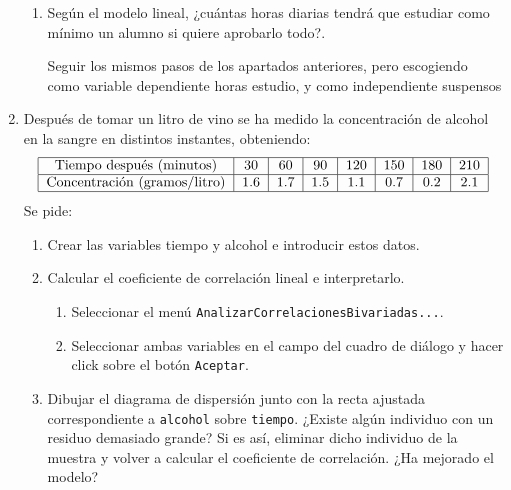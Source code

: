 \begin{enumerate}[leftmargin=*]
\begin{enumerate}
\item Según el modelo lineal, ¿cuántas horas diarias tendrá que
estudiar como mínimo un alumno si quiere aprobarlo todo?.

\begin{indicacion}{
Seguir los mismos pasos de los apartados anteriores, pero
escogiendo como variable dependiente \textsf{horas estudio}, y
como independiente \textsf{suspensos}}
\end{indicacion}



\end{enumerate}

\item Después de tomar un litro de vino se ha medido la
concentración de alcohol en la sangre en distintos instantes, obteniendo:
\[
\begin{tabular}{|c|c|c|c|c|c|c|c|}
\hline Tiempo después (minutos) & 30 & 60 & 90 & 120 & 150 & 180 & 210\\ \hline
Concentración (gramos/litro) & 1.6 & 1.7 & 1.5 & 1.1 & 0.7 & 0.2 & 2.1\\
\hline
\end{tabular}
\]
Se pide:

\begin{enumerate}
\item Crear las variables \textsf{tiempo} y \textsf{alcohol} e introducir estos datos.

\item Calcular el coeficiente de correlación lineal e
interpretarlo.

\begin{indicacion}{
\begin{enumerate}
\item Seleccionar el menú
\texttt{Analizar\flecha Correlaciones\flecha Bivariadas...}.

\item Seleccionar ambas variables en el campo 
del cuadro de diálogo y hacer click sobre el botón
\texttt{Aceptar}.
\end{enumerate}}
\end{indicacion}

\item  Dibujar el diagrama de dispersión junto con la recta
ajustada correspondiente a \texttt{alcohol} sobre \texttt{tiempo}.
¿Existe algún individuo con un residuo demasiado grande? Si es
así, eliminar dicho individuo de la muestra y volver a calcular el
coeficiente de correlación. ¿Ha mejorado el modelo?


\end{enumerate}
\end{enumerate}
